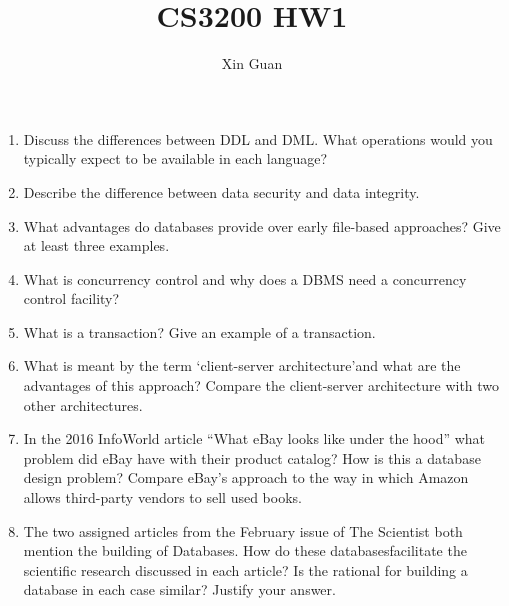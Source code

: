 \documentclass[12pt]{article}
\title{CS3200 HW1}
\date{}
\author{Xin Guan}
\begin{document}
    \maketitle
    \begin{enumerate}
        \item Discuss the differences between DDL and DML. What operations would you typically expect to be available in each language? 
        \item Describe the difference between data security and data integrity. 
        \item What advantages do databases provide over early file-based approaches? Give at least three examples.
        \item What is concurrency control and why does a DBMS need a concurrency control facility?
        \item What is a transaction? Give an example of a transaction. 
        \item What is meant by the term ‘client-server architecture’and what are the advantages of this approach? Compare the client-server architecture with two other architectures. 
        \item  In the 2016 InfoWorld article “What eBay looks like under the hood” what problem did eBay have with their product catalog? How is this a database design problem? Compare eBay’s approach to the way in which Amazon allows third-party vendors to sell used books.
        \item  The two assigned articles from the February issue of The Scientist both mention the building of Databases. How do these databasesfacilitate the scientific research discussed in each article? Is the rational for building a database in each case similar? Justify your answer.
    \end{enumerate}
\end{document}
